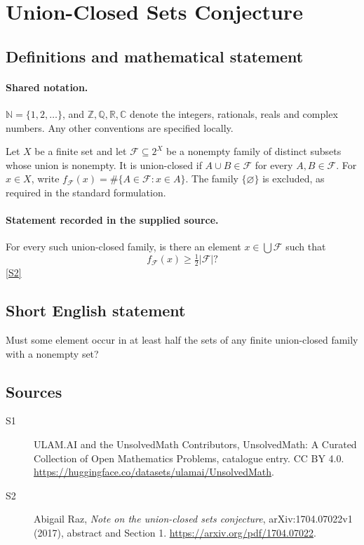 \documentclass[11pt]{article}
\newcommand{\sref}[2]{\hyperlink{source:#1:#2}{[S#2]}}
\begin{document}
\section{Union-Closed Sets Conjecture}\label{statement}

\subsection{Definitions and mathematical statement}

\paragraph{Shared notation.}$\mathbb N=\{1,2,\ldots\}$, and $\mathbb Z,\mathbb Q,\mathbb R,\mathbb C$ denote the integers, rationals, reals and complex numbers. Any other conventions are specified locally.


Let $X$ be a finite set and let $\mathcal F\subseteq2^X$ be a nonempty family of distinct subsets whose union is nonempty. It is union-closed if $A\cup B\in\mathcal F$ for every $A,B\in\mathcal F$. For $x\in X$, write $f_{\mathcal F}(x)=\#\{A\in\mathcal F:x\in A\}$. The family $\{\varnothing\}$ is excluded, as required in the standard formulation.
\paragraph{Statement recorded in the supplied source.}
For every such union-closed family, is there an element $x\in\bigcup\mathcal F$ such that
\[
f_{\mathcal F}(x)\geq\tfrac12|\mathcal F|?
\] \sref{statement}{2}

\subsection{Short English statement}
Must some element occur in at least half the sets of any finite union-closed family with a nonempty set?
\subsection{Sources}
\begin{description}
\item[\hypertarget{source:statement:1}{S1}] ULAM.AI and the UnsolvedMath Contributors, UnsolvedMath: A Curated Collection of Open Mathematics Problems, catalogue entry. CC BY 4.0. \url{https://huggingface.co/datasets/ulamai/UnsolvedMath}.
\item[\hypertarget{source:statement:2}{S2}] Abigail Raz, \emph{Note on the union-closed sets conjecture}, arXiv:1704.07022v1 (2017), abstract and Section 1. \url{https://arxiv.org/pdf/1704.07022}.
\end{description}
\label{end:statement}
\end{document}
